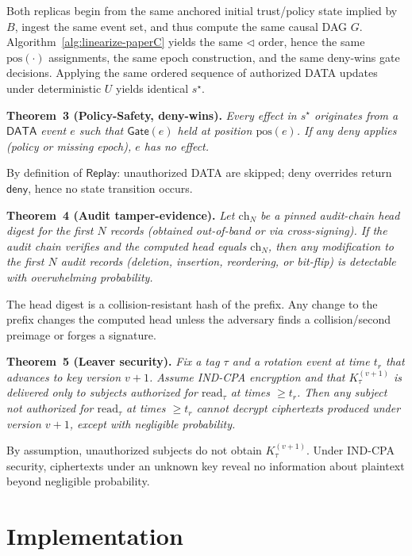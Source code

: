 \documentclass[10pt,journal,compsoc]{IEEEtran}
\begin{document}
Both replicas begin from the same anchored initial trust/policy state implied by $B$, ingest the same event set, and thus compute the same causal DAG $G$.
Algorithm~\ref{alg:linearize-paperC} yields the same $\triangleleft$ order, hence the same $\mathrm{pos}(\cdot)$ assignments, the same epoch construction, and the same deny-wins gate decisions.
Applying the same ordered sequence of authorized \textsc{DATA} updates under deterministic $U$ yields identical $s^\star$.

\medskip
\noindent\textbf{Theorem~3 (Policy-Safety, deny-wins).}
\textit{Every effect in $s^\star$ originates from a $\mathsf{DATA}$ event $e$ such that $\mathsf{Gate}(e)$ held at position $\mathrm{pos}(e)$.
If any deny applies (policy or missing epoch), $e$ has no effect.}


By definition of $\mathsf{Replay}$: unauthorized DATA are skipped; deny overrides return $\mathsf{deny}$, hence no state transition occurs.

\medskip
\noindent\textbf{Theorem~4 (Audit tamper-evidence).}
\textit{Let $\mathrm{ch}_N$ be a pinned audit-chain head digest for the first $N$ records (obtained out-of-band or via cross-signing). If the audit chain verifies and the computed head equals $\mathrm{ch}_N$, then any modification to the first $N$ audit records (deletion, insertion, reordering, or bit-flip) is detectable with overwhelming probability.}


The head digest is a collision-resistant hash of the prefix. Any change to the prefix changes the computed head unless the adversary finds a collision/second preimage or forges a signature.

\medskip
\noindent\textbf{Theorem~5 (Leaver security).}
\textit{Fix a tag $\tau$ and a rotation event at time $t_r$ that advances to key version $v{+}1$. Assume IND-CPA encryption and that $K_{\tau}^{(v+1)}$ is delivered only to subjects authorized for $\mathrm{read}_\tau$ at times $\ge t_r$. Then any subject not authorized for $\mathrm{read}_\tau$ at times $\ge t_r$ cannot decrypt ciphertexts produced under version $v{+}1$, except with negligible probability.}


By assumption, unauthorized subjects do not obtain $K_{\tau}^{(v+1)}$. Under IND-CPA security, ciphertexts under an unknown key reveal no information about plaintext beyond negligible probability.


\section{Implementation}\label{sec:impl-paperC}
\end{document}
